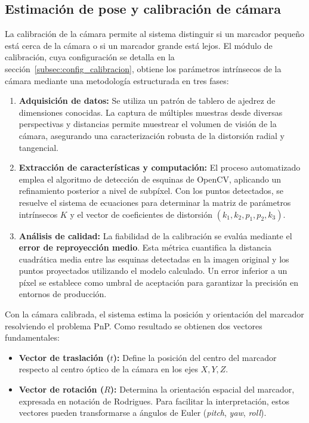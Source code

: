 \subsection{Estimación de pose y calibración de cámara}
\label{subsec:pose_calibracion}

La calibración de la cámara permite al sistema distinguir si un marcador pequeño está cerca de la cámara o si un marcador grande está lejos. El módulo de calibración, cuya configuración se detalla en la sección~\ref{subsec:config_calibracion}, obtiene los parámetros intrínsecos de la cámara mediante una metodología estructurada en tres fases:

\begin{enumerate}
\item \textbf{Adquisición de datos:} Se utiliza un patrón de tablero de ajedrez de dimensiones conocidas. La captura de múltiples muestras desde diversas perspectivas y distancias permite muestrear el volumen de visión de la cámara, asegurando una caracterización robusta de la distorsión radial y tangencial.
\item \textbf{Extracción de características y computación:} El proceso automatizado emplea el algoritmo de detección de esquinas de OpenCV, aplicando un refinamiento posterior a nivel de subpíxel. Con los puntos detectados, se resuelve el sistema de ecuaciones para determinar la matriz de parámetros intrínsecos $K$ y el vector de coeficientes de distorsión $(k_1, k_2, p_1, p_2, k_3)$.
\item \textbf{Análisis de calidad:} La fiabilidad de la calibración se evalúa mediante el \textbf{error de reproyección medio}. Esta métrica cuantifica la distancia cuadrática media entre las esquinas detectadas en la imagen original y los puntos proyectados utilizando el modelo calculado. Un error inferior a un píxel se establece como umbral de aceptación para garantizar la precisión en entornos de producción.
\end{enumerate}

Con la cámara calibrada, el sistema estima la posición y orientación del marcador resolviendo el problema PnP. Como resultado se obtienen dos vectores fundamentales:

\begin{itemize}
\item \textbf{Vector de traslación ($t$):} Define la posición del centro del marcador respecto al centro óptico de la cámara en los ejes $X, Y, Z$.
\item \textbf{Vector de rotación ($R$):} Determina la orientación espacial del marcador, expresada en notación de Rodrigues. Para facilitar la interpretación, estos vectores pueden transformarse a ángulos de Euler (\textit{pitch}, \textit{yaw}, \textit{roll}).
\end{itemize}

